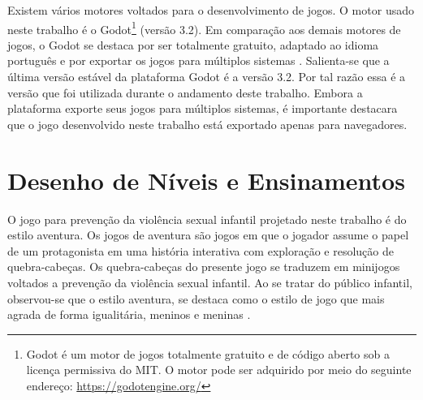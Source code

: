 Existem vários motores voltados para o desenvolvimento de jogos. O motor usado neste trabalho é o Godot\footnote{Godot é um motor de jogos totalmente gratuito e de código aberto sob a licença permissiva do MIT. O motor pode ser adquirido por meio do seguinte endereço: \url{https://godotengine.org/}} (versão 3.2). Em comparação aos demais motores de jogos, o Godot se destaca por ser totalmente gratuito, adaptado ao idioma português e por exportar os jogos para múltiplos sistemas \cite{scherer2020analise}. Salienta-se que a última versão estável da plataforma Godot é a versão 3.2. Por tal razão essa é a versão que foi utilizada durante o andamento deste trabalho. Embora a plataforma exporte seus jogos para múltiplos sistemas, é importante destacara que o jogo desenvolvido neste trabalho está exportado apenas para navegadores. %











\section{Desenho de Níveis e Ensinamentos}\label{sec:DN}

O jogo para prevenção da violência sexual infantil projetado neste trabalho é do estilo aventura. Os jogos de aventura são jogos em que o jogador assume o papel de um protagonista em uma história interativa com exploração e resolução de quebra-cabeças. Os quebra-cabeças do presente jogo se traduzem em minijogos voltados a prevenção da violência sexual infantil. Ao se tratar do público infantil, observou-se que o estilo aventura, se destaca como o estilo de jogo que mais agrada de forma igualitária, meninos e meninas \cite{brandtzaeg2009children}. %

